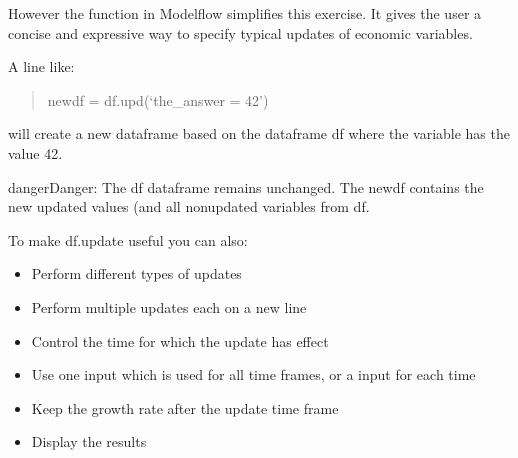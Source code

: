 \documentclass[letterpaper,10pt,english]{jupyterBook}
\begin{document}
\sphinxAtStartPar
However the  function in Modelflow simplifies this exercise.
It gives the user a concise and expressive way to specify
typical updates of economic variables.

\sphinxAtStartPar
A line like:
\begin{quote}

\sphinxAtStartPar
newdf = df.upd(‘the\_answer = 42’)
\end{quote}

\sphinxAtStartPar
will create a new dataframe based on the dataframe df where the variable  has the value 42.

\begin{sphinxadmonition}{danger}{Danger:}
\sphinxAtStartPar
The df dataframe remains unchanged. The newdf contains the new updated values (and all non\sphinxhyphen{}updated variables from df.
\end{sphinxadmonition}

\sphinxAtStartPar
To make df.update useful you can also:
\begin{itemize}
\item {} 
\sphinxAtStartPar
Perform different types of  updates

\item {} 
\sphinxAtStartPar
Perform multiple updates each on a new line

\item {} 
\sphinxAtStartPar
Control the time for which the update has effect

\item {} 
\sphinxAtStartPar
Use one input which is used for all time frames, or a input for each time

\item {} 
\sphinxAtStartPar
Keep the growth rate after the update time frame

\item {} 
\sphinxAtStartPar
Display the results

\end{itemize}

\sphinxAtStartPar
{}
\end{document}
